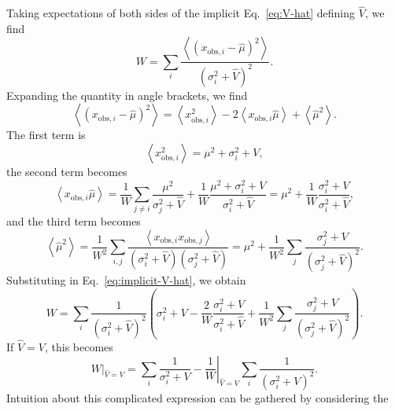 \documentclass[modern]{aastex631}
\begin{document}
Taking expectations of both sides of the implicit Eq.~\eqref{eq:V-hat} defining
$\hat{V}$, we find 
\begin{equation}
    \label{eq:implicit-V-hat}
    W = \sum_i \frac{\left\langle \left( x_{\mathrm{obs},i} - \hat{\mu} \right)^2 \right\rangle}{\left( \sigma_i^2 + \hat{V} \right)^2}.
\end{equation}
Expanding the quantity in angle brackets, we find 
\begin{equation}
    \left\langle \left( x_{\mathrm{obs},i} - \hat{\mu} \right)^2 \right\rangle = \left\langle x_{\mathrm{obs},i}^2 \right\rangle - 2 \left\langle x_{\mathrm{obs},i} \hat{\mu} \right\rangle + \left\langle \hat{\mu}^2 \right\rangle.
\end{equation}
The first term is 
\begin{equation}
    \left\langle x_{\mathrm{obs},i}^2 \right\rangle = \mu^2 + \sigma_i^2 + V,
\end{equation}
the second term becomes 
\begin{equation}
    \left\langle x_{\mathrm{obs},i} \hat{\mu} \right\rangle = \frac{1}{W} \sum_{j\neq i} \frac{\mu^2}{\sigma_j^2 + \hat{V}} + \frac{1}{W} \frac{\mu^2 + \sigma_i^2 + V}{\sigma_i^2 + \hat{V}} = \mu^2 + \frac{1}{W} \frac{\sigma_i^2 + V}{\sigma_i^2 + \hat{V}},      
\end{equation}
and the third term becomes 
\begin{equation}
    \left\langle \hat{\mu}^2 \right\rangle = \frac{1}{W^2} \sum_{i,j} \frac{\left\langle x_{\mathrm{obs},i} x_{\mathrm{obs},j} \right\rangle }{\left( \sigma_i^2 + \hat{V} \right)\left( \sigma_j^2 + \hat{V}\right)} = \mu^2 + \frac{1}{W^2} \sum_j \frac{\sigma_j^2 + V}{\left( \sigma_j^2 + \hat{V} \right)^2}.
\end{equation}
Substituting in Eq.~\eqref{eq:implicit-V-hat}, we obtain 
\begin{equation}
    W = \sum_i \frac{1}{\left(\sigma_i^2 + \hat{V}\right)^2} \left( \sigma_i^2 + V - \frac{2}{W} \frac{\sigma_i^2 + V}{\sigma_i^2 + \hat{V}} + \frac{1}{W^2} \sum_j \frac{\sigma_j^2 + V}{\left( \sigma_j^2 + \hat{V} \right)^2} \right).
\end{equation}
If $\hat{V} = V$, this becomes 
\begin{equation}
    \left. W \right|_{\hat{V} = V} = \sum_i \frac{1}{\sigma_i^2 + V} - \left. \frac{1}{W} \right|_{\hat{V} = V} \sum_i \frac{1}{\left( \sigma_i^2 + V \right)^2}.
\end{equation}
Intuition about this complicated expression can be gathered by considering the
\end{document}
